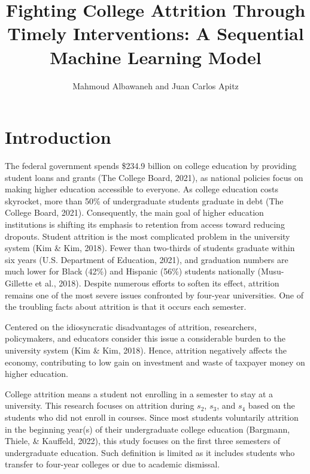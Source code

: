 \documentclass[12pt,a4paper,oneside]{book}
\begin{document}
\author{Mahmoud Albawaneh and Juan Carlos Apitz}
\title{Fighting College Attrition Through Timely Interventions: A Sequential Machine Learning Model }
\date{}
\maketitle

\chapter{Introduction }
The federal government spends \$234.9 billion on college education by providing student loans and grants (The College Board, 2021), as national policies focus on making higher education accessible to everyone.  As college education costs skyrocket, more than 50\% of undergraduate students graduate in debt (The College Board, 2021).  Consequently, the main goal of higher education institutions is shifting its emphasis to retention from access toward reducing dropouts.  Student attrition is the most complicated problem in the university system (Kim \& Kim, 2018).  Fewer than two-thirds of students graduate within six years (U.S. Department of Education, 2021), and graduation numbers are much lower for Black (42\%) and Hispanic (56\%) students nationally (Musu-Gillette et al., 2018).  Despite numerous efforts to soften its effect, attrition remains one of the most severe issues confronted by four-year universities.  One of the troubling facts about attrition is that it occurs each semester.   

Centered on the idiosyncratic disadvantages of attrition, researchers, policymakers, and educators consider this issue a considerable burden to the university system (Kim \& Kim, 2018).  Hence, attrition negatively affects the economy, contributing to low gain on investment and waste of taxpayer money on higher education. 

College attrition means a student not enrolling in a semester to stay at a university.  This research focuses on attrition during $s_{2}$, $s_{3}$, and $s_{4}$ based on the students who did not enroll in courses.  Since most students voluntarily attrition in the beginning year(s) of their undergraduate college education (Bargmann, Thiele, \& Kauffeld, 2022), this study focuses on the first three semesters of undergraduate education.  Such definition is limited as it includes students who transfer to four-year colleges or due to academic dismissal.   
\end{document}

